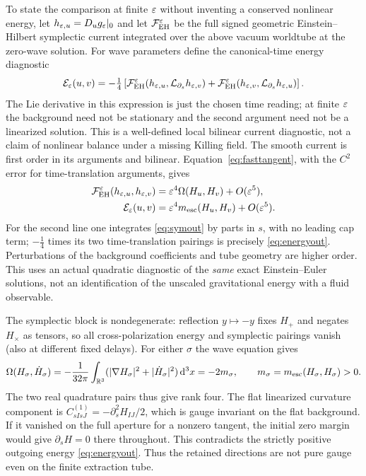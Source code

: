 To state the comparison at finite \(\varepsilon\) without inventing a conserved nonlinear energy, let \(h_{\varepsilon,u}=D_u g_\varepsilon|_0\) and let \(\mathcal F^\varepsilon_{\rm EH}\) be the full signed geometric Einstein--Hilbert symplectic current integrated over the above vacuum worldtube at the zero-wave solution. For wave parameters define the canonical-time energy diagnostic
\[
 \mathcal E_\varepsilon(u,v)
  =-\tfrac14\left[
    \mathcal F^\varepsilon_{\rm EH}(h_{\varepsilon,u},\mathcal L_{\partial_s}h_{\varepsilon,v})
   +\mathcal F^\varepsilon_{\rm EH}(h_{\varepsilon,v},\mathcal L_{\partial_s}h_{\varepsilon,u})\right] .
\]
The Lie derivative in this expression is just the chosen time reading; at finite \(\varepsilon\) the background need not be stationary and the second argument need not be a linearized solution. This is a well-defined local bilinear current diagnostic, not a claim of nonlinear balance under a missing Killing field. The smooth current is first order in its arguments and bilinear. Equation~\eqref{eq:fasttangent}, with the \(C^2\) error for time-translation arguments, gives
\begin{align}
 \mathcal F^\varepsilon_{\rm EH}(h_{\varepsilon,u},h_{\varepsilon,v})
      &=\varepsilon^4\Omega(H_u,H_v)+O(\varepsilon^5),\label{eq:EHlimit}\\
 \mathcal E_\varepsilon(u,v)&=\varepsilon^4m_{\mathrm{esc}}(H_u,H_v)+O(\varepsilon^5).
      \label{eq:Elimit}
\end{align}
For the second line one integrates \eqref{eq:symout} by parts in \(s\), with no leading cap term; \(-\tfrac14\) times its two time-translation pairings is precisely \eqref{eq:energyout}. Perturbations of the background coefficients and tube geometry are higher order. This uses an actual quadratic diagnostic of the \emph{same} exact Einstein--Euler solutions, not an identification of the unscaled gravitational energy with a fluid observable.

The symplectic block is nondegenerate: reflection \(y\mapsto -y\) fixes \(H_+\) and negates \(H_\times\) as tensors, so all cross-polarization energy and symplectic pairings vanish (also at different fixed delays). For either \(\sigma\) the wave equation gives
\[
      \Omega(H_\sigma,\dot H_\sigma)
       =-\frac1{32\pi}\int_{\mathbb R^3}
                  (|\nabla H_\sigma|^2+|\dot H_\sigma|^2)\,\mathrm d^3x
       =-2m_\sigma,\qquad m_\sigma=m_{\mathrm{esc}}(H_\sigma,H_\sigma)>0 .
\]
The two real quadrature pairs thus give rank four. The flat linearized curvature component is \(C^{(1)}_{sIsJ}=-\partial_s^2H_{IJ}/2\), which is gauge invariant on the flat background. If it vanished on the full aperture for a nonzero tangent, the initial zero margin would give \(\partial_sH=0\) there throughout. This contradicts the strictly positive outgoing energy \eqref{eq:energyout}. Thus the retained directions are not pure gauge even on the finite extraction tube.

